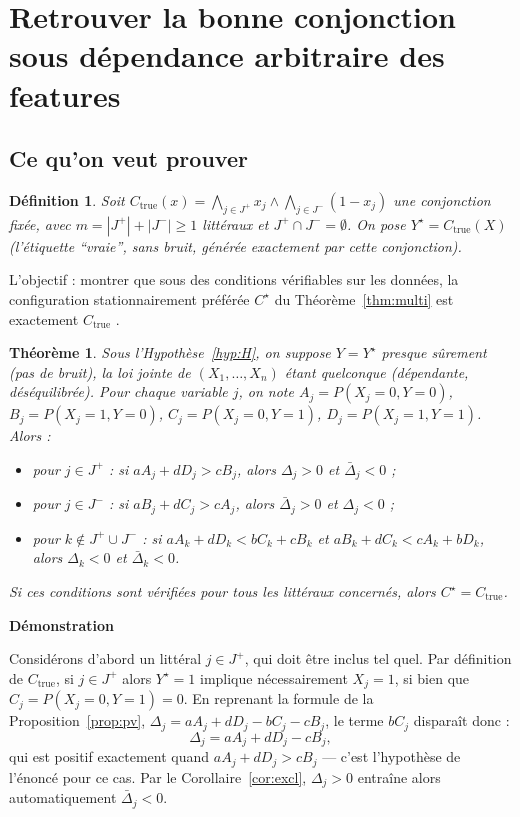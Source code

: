 \documentclass[11pt]{article}
\newtheorem{theorem}{Théorème}
\newtheorem{definition}{Définition}
\begin{document}
\section{Retrouver la bonne conjonction sous dépendance arbitraire des features}

\subsection{Ce qu'on veut prouver}

\begin{definition}\label{def:ctrue}
Soit $C_{\text{true}}(x) = \bigwedge_{j \in J^+} x_j \wedge \bigwedge_{j\in J^-}(1-x_j)$ une conjonction fixée, avec $m = |J^+|+|J^-| \ge 1$ littéraux et $J^+ \cap J^- = \emptyset$. On pose $Y^\star = C_{\text{true}}(X)$ (l'étiquette ``vraie'', sans bruit, générée exactement par cette conjonction).
\end{definition}

L'objectif : montrer que sous des conditions vérifiables sur les données, la configuration stationnairement préférée $C^\star$ du Théorème~\ref{thm:multi} est exactement $C_{\text{true}}$ .

\begin{theorem}\label{thm:identif}
Sous l'Hypothèse~\ref{hyp:H}, on suppose $Y = Y^\star$ presque sûrement (pas de bruit), la loi jointe de $(X_1,\dots,X_n)$ étant quelconque (dépendante, déséquilibrée). Pour chaque variable $j$, on note $A_j = P(X_j=0,Y=0)$, $B_j = P(X_j=1,Y=0)$, $C_j = P(X_j=0,Y=1)$, $D_j = P(X_j=1,Y=1)$. Alors :
\begin{itemize}
\item pour $j \in J^+$ : si $aA_j + dD_j > cB_j$, alors $\Delta_j > 0$ et $\bar\Delta_j < 0$ ;
\item pour $j \in J^-$ : si $aB_j + dC_j > cA_j$, alors $\bar\Delta_j > 0$ et $\Delta_j < 0$ ;
\item pour $k \notin J^+\cup J^-$ : si $aA_k+dD_k < bC_k+cB_k$ et $aB_k+dC_k < cA_k+bD_k$, alors $\Delta_k<0$ et $\bar\Delta_k<0$.
\end{itemize}
Si ces conditions sont vérifiées pour tous les littéraux concernés, alors $C^\star = C_{\text{true}}$.
\end{theorem}

\textbf{Démonstration}

Considérons d'abord un littéral $j \in J^+$, qui doit être inclus tel quel. Par définition de $C_{\text{true}}$, si $j \in J^+$ alors $Y^\star=1$ implique nécessairement $X_j=1$, si bien que $C_j = P(X_j=0,Y=1)=0$. En reprenant la formule de la Proposition~\ref{prop:pv}, $\Delta_j = aA_j+dD_j-bC_j-cB_j$, le terme $bC_j$ disparaît donc :
$$\Delta_j = aA_j+dD_j-cB_j,$$
qui est positif exactement quand $aA_j+dD_j > cB_j$ — c'est l'hypothèse de l'énoncé pour ce cas. Par le Corollaire~\ref{cor:excl}, $\Delta_j>0$ entraîne alors automatiquement $\bar\Delta_j<0$.
\end{document}
